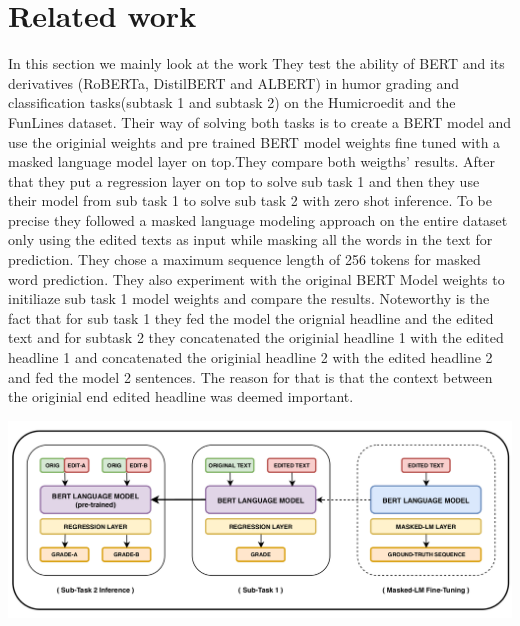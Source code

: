 \documentclass[11pt,a4paper,onecolumn,oneside,notitlepage]{article}
\begin{document}
	\section{Related work}
		In this section we mainly look at the work \textcite{Bert1}
		They test the ability of BERT and its derivatives (RoBERTa, DistilBERT and ALBERT) in humor grading and classification tasks(subtask 1 and subtask 2) on the Humicroedit and the FunLines dataset.
		Their way of solving both tasks is to create a  BERT model and use the originial weights and  pre trained BERT model weights  fine tuned  with a masked language model layer on top.They compare both weigths' results. After that they put a regression layer on top to solve sub task 1 and then they use their model from sub task 1 to solve sub task 2 with zero shot inference. 
		To be precise they followed a masked language modeling approach on the entire dataset only using the edited texts as input while masking all the words in the text for prediction. They chose a maximum sequence length of 256 tokens for masked word prediction. They also experiment with the original BERT Model weights to initiliaze sub task 1 model weights and compare the results.
		Noteworthy is the fact that for sub  task 1 they fed the model the orignial headline and the edited text and for subtask 2 they concatenated the originial headline 1 with the edited headline 1 and concatenated the originial headline 2 with the edited headline 2 and fed the model 2 sentences.
		The reason for that is that the context between the originial end edited headline was deemed important.

				\includegraphics[width=1.0\linewidth]{system_architecture.png}
	
\end{document}
